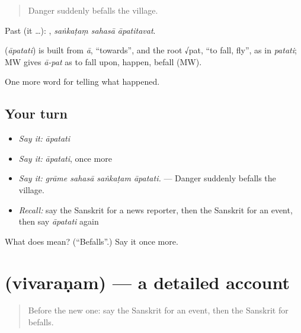 \begin{quote}
Danger suddenly befalls the village.
\end{quote}

Past (it …):   , \emph{saṅkaṭaṃ sahasā āpatitavat}.

\begin{cousinweb}
\textbf{} (\emph{āpatati}) is built from \emph{ā}, \textquotedblleft{}towards\textquotedblright{}, and the root √pat, \textquotedblleft{}to fall, fly\textquotedblright{}, as in \emph{patati}; MW gives \emph{ā-pat} as to fall upon, happen, befall (MW).
\end{cousinweb}

\begin{grammarlens}[title={What you've built}]
One more word for telling what happened.
\end{grammarlens}

\subsection*{Your turn}
\begin{itemize}
\raggedright
  \item \emph{Say it:} \emph{āpatati}
  \item \emph{Say it:} \emph{āpatati}, once more
  \item \emph{Say it:} \emph{grāme sahasā saṅkaṭam āpatati.} — Danger suddenly befalls the village.
  \item \emph{Recall:} say the Sanskrit for a news reporter, then the Sanskrit for an event, then say \emph{āpatati} again
\end{itemize}

\begin{tcolorbox}[breakable,colback=teal!4,colframe=teal!35!black,title={Before you move on}]
What does  mean? (\textquotedblleft{}Befalls\textquotedblright{}.) Say it once more.
\end{tcolorbox}
\section[\texorpdfstring{\sk{विवरणम्} (vivaraṇam)}{विवरणम् (vivaraṇam)}]{ (vivaraṇam) — a detailed account}

\label{lesson:SA-C310-vivaranam}



\begin{quote}
Before the new one: say the Sanskrit for an event, then the Sanskrit for befalls.
\end{quote}

